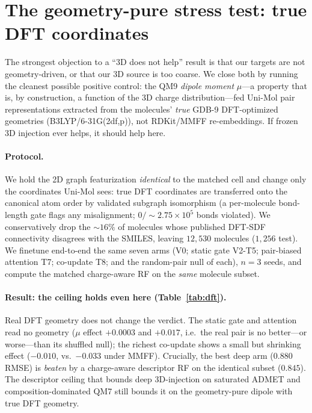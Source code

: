 \section{The geometry-pure stress test: true DFT coordinates}
\label{sec:dft}

The strongest objection to a ``3D does not help'' result is that our targets are
not geometry-driven, or that our 3D source is too coarse. We close both by
running the cleanest possible positive control: the QM9 \emph{dipole moment}
$\mu$---a property that is, by construction, a function of the 3D charge
distribution---fed Uni-Mol pair representations extracted from the molecules'
\emph{true} GDB-9 DFT-optimized geometries (B3LYP/6-31G(2df,p)), not RDKit/MMFF
re-embeddings. If frozen 3D injection ever helps, it should help here.

\paragraph{Protocol.}
We hold the 2D graph featurization \emph{identical} to the matched cell and
change only the coordinates Uni-Mol sees: true DFT coordinates are transferred
onto the canonical atom order by validated subgraph isomorphism (a per-molecule
bond-length gate flags any misalignment; $0/{\sim}2.75\!\times\!10^{5}$ bonds
violated). We conservatively drop the ${\sim}16\%$ of molecules whose published
DFT-SDF connectivity disagrees with the SMILES, leaving $12{,}530$ molecules
($1{,}256$ test). We finetune end-to-end the same seven arms
(V0; static gate V2-T5; pair-biased attention T7; co-update T8; and the
random-pair null of each), $n{=}3$ seeds, and compute the matched
charge-aware RF on the \emph{same} molecule subset.

\paragraph{Result: the ceiling holds even here (Table~\ref{tab:dft}).}
Real DFT geometry does not change the verdict. The static gate and attention read
no geometry ($\mu$ effect $+0.0003$ and $+0.017$, i.e.\ the real pair is no
better---or worse---than its shuffled null); the richest co-update shows a small
but shrinking effect ($-0.010$, vs.\ $-0.033$ under MMFF). Crucially, the best
deep arm ($0.880$ RMSE) is \emph{beaten} by a charge-aware descriptor RF on the
identical subset ($0.845$). The descriptor ceiling that bounds deep 3D-injection
on saturated ADMET and composition-dominated QM7 still bounds it on the
geometry-pure dipole with true DFT geometry.

